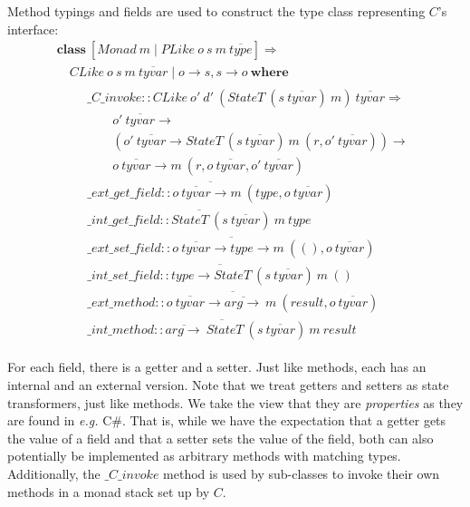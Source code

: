 Method typings and fields are used to construct the type class representing $C$'s interface: 
\begin{displaymath}
\begin{array}{l}
\mathbf{class}~[\mathit{Monad}~m \mid \mathit{PLike}~o~s~m~\overline{\mathit{type}}] \Rightarrow \\
\quad \mathit{CLike}~o~s~m~\overline{\mathit{tyvar}} \mid o \to s, s \to o~\mathbf{where} \\
\qquad \begin{array}{l}
\_\mathit{C}\_\mathit{invoke} :: \mathit{CLike}~o'~d'~(\mathit{StateT}~(s~\overline{\mathit{tyvar}})~m)~\overline{\mathit{tyvar}} \Rightarrow \\
\qquad o'~\overline{\mathit{tyvar}} \to \\ \qquad (o'~\overline{\mathit{tyvar}} \to \mathit{StateT}~(s~\overline{\mathit{tyvar}})~m~(r,o'~\overline{\mathit{tyvar}})) \to\\\qquad
o~\overline{\mathit{tyvar}} \to m~(r,o~\overline{\mathit{tyvar}},o'~\overline{\mathit{tyvar}}) \\
\overline{\_\mathit{ext}\_\mathit{get}\_\mathit{field} :: o~\overline{\mathit{tyvar}} \to m~(\mathit{type}, o~\overline{\mathit{tyvar}}) } \\
\overline{\_\mathit{int}\_\mathit{get}\_\mathit{field} :: \mathit{StateT}~(s~\overline{\mathit{tyvar}})~m~\mathit{type}} \\
\overline{\_\mathit{ext}\_\mathit{set}\_\mathit{field} :: o~\overline{\mathit{tyvar}} \to \mathit{type} \to m~((),o~\overline{\mathit{tyvar}})} \\
\overline{\_\mathit{int}\_\mathit{set}\_\mathit{field} :: \mathit{type} \to \mathit{StateT}~(s~\overline{\mathit{tyvar}})~m~()} \\
\overline{\_\mathit{ext\_method} :: o~\overline{\mathit{tyvar}} \to \overline{\mathit{arg} \to}~m~(\mathit{result},o~\overline{\mathit{tyvar}})}\\
\overline{\_\mathit{int\_method} :: \overline{\mathit{arg} \to}~ \mathit{StateT}~(s~\overline{\mathit{tyvar}})~m~\mathit{result} }
\end{array}
\end{array}
\end{displaymath}

For each field, there is a getter and a setter. Just like methods, each has an internal and an external version. Note that we treat getters and setters as state transformers, just like methods. We take the view that they are \emph{properties} as they are found in \emph{e.g.} C\#. That is, while we have the expectation that a getter gets the value of a field and that a setter sets the value of the field, both can also potentially be implemented as arbitrary methods with matching types. Additionally, the $\_\mathit{C}\_\mathit{invoke}$ method is used by sub-classes to invoke their own methods in a monad stack set up by $C$.

